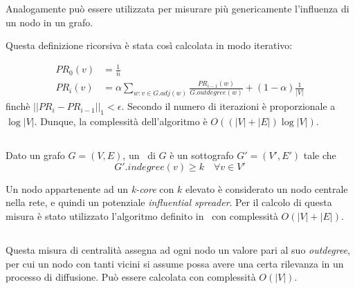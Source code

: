 Analogamente può essere utilizzata per misurare più genericamente l'influenza di un nodo 
in un grafo.

Questa definizione ricorsiva è stata così calcolata in modo iterativo: 

\begin{equation}
    \begin{split}
PR_0(v)&= \frac{1}{n}\\
PR_i(v)&= \alpha \sum_{w : v \in G.adj(w)} 
\frac{PR_{i-1}(w)}{G.outdegree(w)} + 
(1-\alpha)\frac{1}{|V|}
    \end{split}
\end{equation}
finchè $||PR_{i} - PR_{i-1}||_1 < \epsilon$. Secondo \cite{page:pagerank} il numero di iterazioni 
è proporzionale a $\log{|V|}$. Dunque, la complessità dell'algoritmo è $O((|V| + |E|)\log{|V|})$.


\subsection{\kcore}
\begin{definizione}[\kcore]
    \label{def:kcore}
    Dato un grafo $G=(V, E)$, un \kcore\ di $G$ è un sottografo $G'=(V',E')$
    tale che 
    \begin{equation}
        G'.indegree(v) \geq k \quad \forall v \in V'
    \end{equation}
\end{definizione}

Un nodo appartenente ad un \textit{k-core} con $k$ elevato è considerato un nodo centrale 
nella rete, e quindi un potenziale \textit{influential spreader}.
Per il calcolo di questa misura è stato utilizzato l'algoritmo definito in~\cite{batagelj:kcore}
con complessità $O(|V| + |E|)$.

\subsection{\degree}
Questa misura di centralità assegna ad ogni nodo un valore pari al suo \textit{outdegree}, 
per cui un nodo con tanti vicini si assume possa avere una certa rilevanza in un 
processo di diffusione.
Può essere calcolata con complessità $O(|V|)$.

